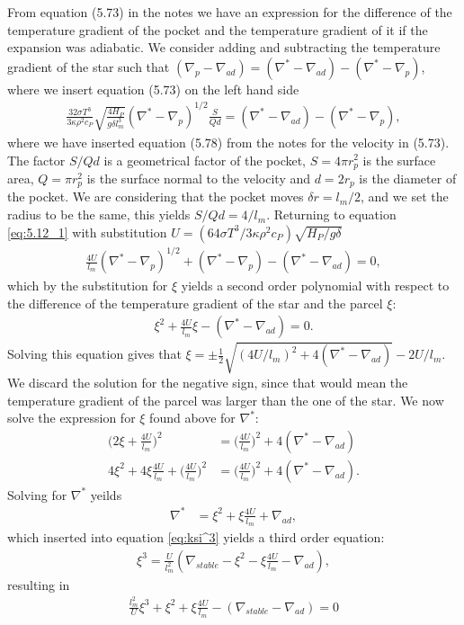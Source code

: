 \documentclass[a4paper,10pt]{article}
\begin{document}
From equation (5.73) in the notes we have an expression for the difference of the temperature gradient of the pocket and the temperature gradient of it if the expansion was adiabatic. We consider adding and subtracting the temperature gradient of the star such that $(\nabla_p - \nabla_{ad}) = (\nabla^* - \nabla_{ad}) - (\nabla^* - \nabla_p)$, where we insert equation (5.73) on the left hand side
%
\begin{align}\label{eq:5.12_1}
\frac{32\sigma T^3}{3\kappa \rho^2 c_P}\sqrt{\frac{4H_P}{g\delta l_m^3}}(\nabla^* - \nabla_p)^{1/2} \frac{S}{Qd} = (\nabla^* - \nabla_{ad} )-(\nabla^* - \nabla_p),
\end{align}
%
where we have inserted equation (5.78) from the notes for the velocity in (5.73). The factor $S/Qd$ is a geometrical factor of the pocket, $S = 4\pi r_p^2$ is the surface area, $Q = \pi r_p^2$ is the surface normal to the velocity and $d = 2r_p$ is the diameter of the pocket. We are considering that the pocket moves $\delta r = l_m/2$, and we set the radius to be the same, this yields $S/Qd = 4/l_m$. Returning to equation \eqref{eq:5.12_1} with substitution $U = (64\sigma T^3/3\kappa \rho^2 c_P )\sqrt{H_P/g\delta}$ 
%
\begin{align*}
\frac{4U}{l_m}(\nabla^* - \nabla_p)^{1/2} + (\nabla^* - \nabla_p) - (\nabla^* - \nabla_{ad}) = 0,
\end{align*}
%
which by the substitution for $\xi$ yields a second order polynomial with respect to the difference of the temperature gradient of the star and the parcel $\xi$:
%
\begin{align}
\xi^2 + \frac{4U}{l_m}\xi - (\nabla^* - \nabla_{ad}) = 0.
\end{align}
%
Solving this equation gives that $\xi = \pm \frac{1}{2}\sqrt{(4U/l_m)^2 + 4(\nabla^* - \nabla_{ad})} - 2U/l_m$. We discard the solution for the negative sign, since that would mean the temperature gradient of the parcel was larger than the one of the star. We now solve the expression for $\xi$ found above for $\nabla^*$:
%
\begin{align*}
\bigg(2\xi + \frac{4U}{l_m}\bigg)^2 &= \bigg(\frac{4U}{l_m}\bigg)^2 + 4(\nabla^* - \nabla_{ad})\\
4\xi^2 + 4\xi \frac{4U}{l_m} + \bigg(\frac{4U}{l_m}\bigg)^2 &= \bigg(\frac{4U}{l_m}\bigg)^2 + 4(\nabla^* - \nabla_{ad}).
\end{align*}
%
Solving for $\nabla^*$ yeilds
%
\begin{align}\label{eq:nab*}
\nabla^* &= \xi^2 + \xi\frac{4U}{l_m} + \nabla_{ad},
\end{align}
%
which inserted into equation \eqref{eq:ksi^3} yields a third order equation:
%
\begin{align*}
\xi^3 = \frac{U}{l_m^2}(\nabla_{stable} - \xi^2 - \xi\frac{4U}{l_m} - \nabla_{ad}),
\end{align*}
%
resulting in
\begin{align}
\frac{l_m^2}{U}\xi^3 + \xi^2 + \xi\frac{4U}{l_m} - (\nabla_{stable} - \nabla_{ad}) = 0
\end{align}
%
\end{document}
